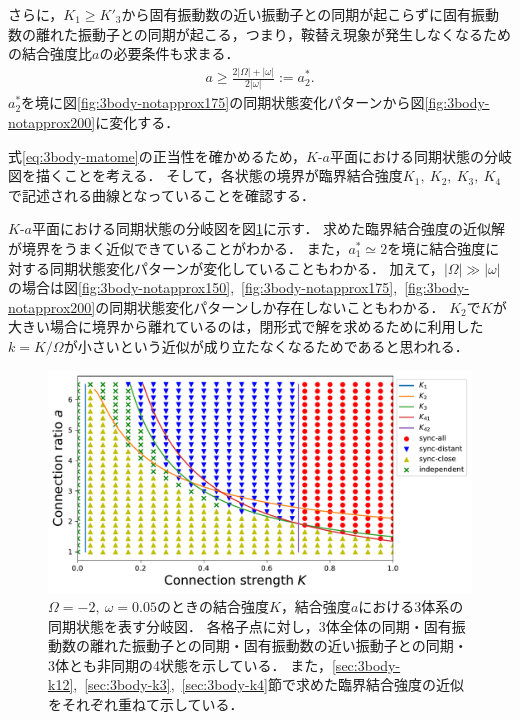 \documentclass[../main]{subfiles}
\begin{document}
    さらに，$K_1\geq K'_3$から固有振動数の近い振動子との同期が起こらずに固有振動数の離れた振動子との同期が起こる，つまり，鞍替え現象が発生しなくなるための結合強度比$a$の必要条件も求まる．
    \begin{align}
        \label{eq:a-ast2}
        a\geq \frac{2|\Omega|+|\omega|}{2|\omega|}:=a^\ast_2.    
    \end{align}
    $a^\ast_2$を境に図\ref{fig:3body-notapprox175}の同期状態変化パターンから図\ref{fig:3body-notapprox200}に変化する．

    式\eqref{eq:3body-matome}の正当性を確かめるため，$K$-$a$平面における同期状態の分岐図を描くことを考える．
    そして，各状態の境界が臨界結合強度$K_1,\ K_2,\ K_3,\ K_4$で記述される曲線となっていることを確認する．

    $K$-$a$平面における同期状態の分岐図を図\ref{fig:3body-phase}に示す．
    求めた臨界結合強度の近似解が境界をうまく近似できていることがわかる．
    また，$a^\ast_1\simeq 2$を境に結合強度に対する同期状態変化パターンが変化していることもわかる．
    加えて，$|\Omega|\gg|\omega|$の場合は図\ref{fig:3body-notapprox150},\ \ref{fig:3body-notapprox175},\ \ref{fig:3body-notapprox200}の同期状態変化パターンしか存在しないこともわかる．
    $K_2$で$K$が大きい場合に境界から離れているのは，閉形式で解を求めるために利用した$k=K/\Omega$が小さいという近似が成り立たなくなるためであると思われる．

    \begin{figure}[tbp]
    \centering
    \includegraphics[width=135mm]{images/three-body-phase.pdf}
    \centering
    \caption{$\Omega=-2,\ \omega=0.05$のときの結合強度$K$，結合強度$a$における3体系の同期状態を表す分岐図．
    各格子点に対し，3体全体の同期・固有振動数の離れた振動子との同期・固有振動数の近い振動子との同期・3体とも非同期の4状態を示している．
    また，\ref{sec:3body-k12},\ \ref{sec:3body-k3},\ \ref{sec:3body-k4}節で求めた臨界結合強度の近似をそれぞれ重ねて示している．
    }
    \label{fig:3body-phase}
    \end{figure}
\end{document}
